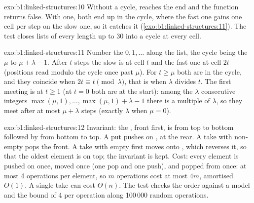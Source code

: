 \begin{solution}{exo:b1:linked-structures:10}
Without a cycle,  reaches the end and the function returns false. With one, both  end up in the
cycle, where the fast one gains one cell per step on the slow one, so it catches it
(\cref{exo:b1:linked-structures:11}). The test closes lists of every length up to 30 into a cycle at every cell.
\end{solution}

\begin{solution}{exo:b1:linked-structures:11}
Number the  $0, 1, \dots$ along the list, the cycle being the  $\mu$ to $\mu + \lambda - 1$. After $t$ steps
the slow  is at cell $t$ and the fast one at cell $2t$ (positions read modulo the cycle once past $\mu$). For
$t \geq \mu$ both are in the cycle, and they coincide when $2t \equiv t \pmod \lambda$, that is when $\lambda$ divides
$t$. The first meeting is at $t \geq 1$ (at $t = 0$ both are at the start): among the $\lambda$ consecutive integers
$\max(\mu, 1), \dots, \max(\mu, 1) + \lambda - 1$ there is a multiple of $\lambda$, so they meet after at most
$\mu + \lambda$ steps (exactly $\lambda$ when $\mu = 0$).
\end{solution}

\begin{solution}{exo:b1:linked-structures:12}
Invariant: the , front first, is  from top to bottom followed by  from bottom to top. A put
pushes on , at the rear. A take with  non-empty pops the front. A take with  empty first
moves  onto , which reverses it, so that the oldest element is on top; the invariant is kept.
Cost: every element is pushed on  once, moved once (one pop and one push), and popped from  once: at
most 4  operations per element, so $m$ operations cost at most $4m$, amortised $O(1)$. A single take can cost
$\Theta(n)$. The test checks the order against a model and the bound of 4 per operation along 100\,000 random
operations.
\end{solution}

